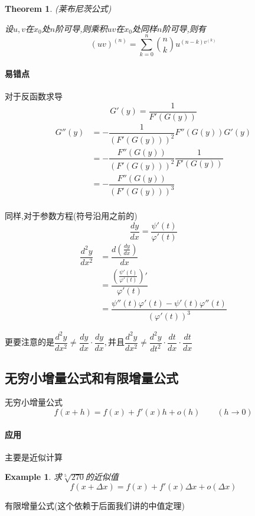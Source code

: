 \documentclass[11pt,hyperref,a4paper,UTF8]{ctexart}
\newtheorem{theorem}{Theorem}[subsection]
\newtheorem{example}{Example}[subsection]
\newcommand{\parameter}[1]{\left(#1\right)}
\begin{document}
\begin{CJK}{UTF8}{gkai}
\begin{theorem}
(莱布尼茨公式)  

设$u,v$在$x_0$处$n$阶可导,则乘积$uv$在$x_0$处同样$n$阶可导,则有
\[(uv)^{(n)} = \sum_{k = 0}^n \binom{n}{k} u^{(n - k) v^{(k)}}\]
\end{theorem}

\paragraph{易错点}
对于反函数求导
\[G'(y) = \dfrac{1}{F'(G(y))}\]
\[
\begin{aligned}
  G''(y) &= -\dfrac{1}{\parameter{F'(G(y))}^2} F''(G(y)) G'(y)\\
  &=-\dfrac{F''(G(y))}{\parameter{F'(G(y))}^2}  \dfrac{1}{F'(G(y))}\\
  &=-\dfrac{F''(G(y))}{\parameter{F'(G(y))}^3}\\
\end{aligned}  
\]

同样,对于参数方程(符号沿用之前的)
\[\dfrac{dy}{dx} = \dfrac{\psi'(t)}{\varphi'(t)}\]
\[
\begin{aligned}
  \dfrac{d^2y}{dx^2} &= \dfrac{d\parameter{\frac{dy}{dx}}}{dx}\\
  &=\dfrac{\parameter{\frac{\psi'(t)}{\varphi'(t)}}'}{\varphi'(t)}\\
  &=\dfrac{\psi''(t)\varphi'(t) -\psi'(t) \varphi''(t)}{\parameter{\varphi'(t)}^3}
\end{aligned}  
 \]

更要注意的是$\dfrac{d^2 y}{dx^2} \neq \dfrac{dy}{dx} \cdot \dfrac{dy}{dx},\text{并且}\dfrac{d^2 y}{dx^2} \neq \dfrac{d^2 y}{dt^2} \cdot \dfrac{dt}{dx}\cdot \dfrac{dt}{dx}$

\subsection{无穷小增量公式和有限增量公式}
无穷小增量公式
\[f(x + h) = f(x) + f'(x) h + o(h)\quad\quad(h\to 0)\]

\paragraph{应用\\}
主要是近似计算

\begin{example}
  求$\sqrt[5]{270}$的近似值
  \[f(x + \Delta x) = f(x) + f'(x) \Delta x + o(\Delta x)\]
\end{example}
有限增量公式(这个依赖于后面我们讲的中值定理)


\end{CJK}
\end{document}
